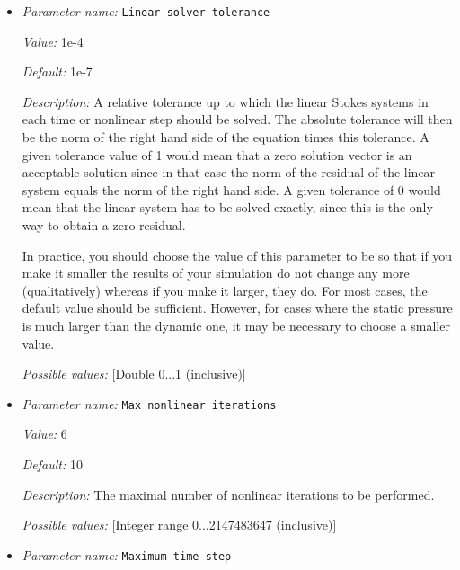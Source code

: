 \begin{itemize}
{\it Value:} 0


{\it Default:} 5.69e+300


{\it Description:} The end time of the simulation. The default value is a number so that when converted from years to seconds it is approximately equal to the largest number representable in floating point arithmetic. For all practical purposes, this equals infinity. Units: Years if the 'Use years in output instead of seconds' parameter is set; seconds otherwise.


{\it Possible values:} [Double -1.79769e+308...1.79769e+308 (inclusive)]
\item {\it Parameter name:} {\tt Linear solver tolerance}


{\it Value:} 1e-4


{\it Default:} 1e-7


{\it Description:} A relative tolerance up to which the linear Stokes systems in each time or nonlinear step should be solved. The absolute tolerance will then be the norm of the right hand side of the equation times this tolerance. A given tolerance value of 1 would mean that a zero solution vector is an acceptable solution since in that case the norm of the residual of the linear system equals the norm of the right hand side. A given tolerance of 0 would mean that the linear system has to be solved exactly, since this is the only way to obtain a zero residual.

In practice, you should choose the value of this parameter to be so that if you make it smaller the results of your simulation do not change any more (qualitatively) whereas if you make it larger, they do. For most cases, the default value should be sufficient. However, for cases where the static pressure is much larger than the dynamic one, it may be necessary to choose a smaller value.


{\it Possible values:} [Double 0...1 (inclusive)]
\item {\it Parameter name:} {\tt Max nonlinear iterations}


{\it Value:} 6


{\it Default:} 10


{\it Description:} The maximal number of nonlinear iterations to be performed.


{\it Possible values:} [Integer range 0...2147483647 (inclusive)]
\item {\it Parameter name:} {\tt Maximum time step}



\end{itemize}
